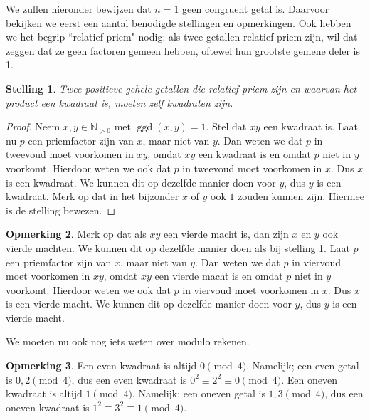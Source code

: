 \documentclass[12pt,reqno]{article}
\newcommand*{\NO}{\ensuremath{\mathbb{N}_{>0}}}
\theoremstyle{theorem}
\newtheorem{theorem}{Stelling}
\theoremstyle{definition}
\newtheorem{remark}[theorem]{Opmerking}
\DeclareMathOperator{\ggd}{ggd}
\begin{document}
	We zullen hieronder bewijzen dat $n=1$ geen congruent getal is. Daarvoor bekijken we eerst een aantal benodigde stellingen en opmerkingen. Ook hebben we het begrip ``relatief priem" nodig: als twee getallen relatief priem zijn, wil dat zeggen dat ze geen factoren gemeen hebben, oftewel hun grootste gemene deler is 1.
	
	\begin{theorem}\label{1:hulp2}
		Twee positieve gehele getallen die relatief priem zijn en waarvan het product een kwadraat is, moeten zelf kwadraten zijn.
	\end{theorem}
	\begin{proof}
		Neem $x,y\in\NO$ met $\ggd(x,y) = 1$. Stel dat $xy$ een kwadraat is. Laat nu $p$ een priemfactor zijn van $x$, maar niet van $y$. Dan weten we dat $p$ in tweevoud moet voorkomen in $xy$, omdat $xy$ een kwadraat is en omdat $p$ niet in $y$ voorkomt. Hierdoor weten we ook dat $p$ in tweevoud moet voorkomen in $x$. Dus $x$ is een kwadraat. We kunnen dit op dezelfde manier doen voor $y$, dus $y$ is een kwadraat. Merk op dat in het bijzonder $x$ of $y$ ook $1$ zouden kunnen zijn. Hiermee is de stelling bewezen.
	\end{proof}
	
	\begin{remark}\label{1:hulp4}
		Merk op dat als $xy$ een vierde macht is, dan zijn $x$ en $y$ ook vierde machten. We kunnen dit op dezelfde manier doen als bij stelling \ref{1:hulp2}. Laat $p$ een priemfactor zijn van $x$, maar niet van $y$. Dan weten we dat $p$ in viervoud moet voorkomen in $xy$, omdat $xy$ een vierde macht is en omdat $p$ niet in $y$ voorkomt. Hierdoor weten we ook dat $p$ in viervoud moet voorkomen in $x$. Dus $x$ is een vierde macht. We kunnen dit op dezelfde manier doen voor $y$, dus $y$ is een vierde macht.
	\end{remark}
	
	We moeten nu ook nog iets weten over modulo rekenen.
	\begin{remark}\label{1:hulpMod}
		Een even kwadraat is altijd $0 \pmod{4}$. Namelijk; een even getal is $0,2 \pmod{4}$, dus een even kwadraat is $0^2 \equiv 2^2 \equiv 0 \pmod{4}$. Een oneven kwadraat is altijd $1 \pmod{4}$. Namelijk; een oneven getal is $1,3 \pmod{4}$, dus een oneven kwadraat is $1^2 \equiv 3^2 \equiv 1 \pmod{4}$.
	\end{remark}
		
\end{document}

